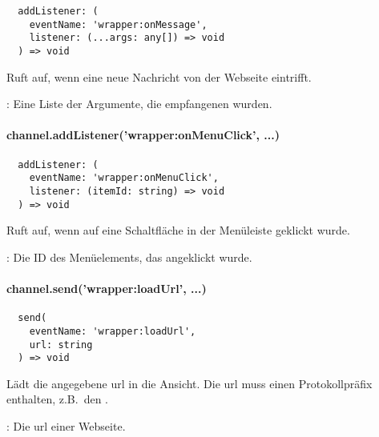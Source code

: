 \begin{verbatim}
  addListener: (
    eventName: 'wrapper:onMessage',
    listener: (...args: any[]) => void
  ) => void
\end{verbatim}

Ruft  auf, wenn eine neue Nachricht von der Webseite eintrifft.

\begin{arguments}
  \item {}: Eine Liste der Argumente, die empfangenen wurden.
\end{arguments}


\newpage

\paragraph{channel.addListener('wrapper:onMenuClick', ...)}

\begin{verbatim}
  addListener: (
    eventName: 'wrapper:onMenuClick',
    listener: (itemId: string) => void
  ) => void
\end{verbatim}

Ruft  auf, wenn auf eine Schaltfläche in der Menüleiste geklickt wurde.

\begin{arguments}
  \item {}: Die ID des Menüelements, das angeklickt wurde.
\end{arguments}




\paragraph{channel.send('wrapper:loadUrl', ...)}

\begin{verbatim}
  send(
    eventName: 'wrapper:loadUrl',
    url: string
  ) => void
\end{verbatim}

Lädt die angegebene \ac{url} in die Ansicht.
Die \ac{url} muss einen Protokollpräfix enthalten, z.B.\ den .

\begin{arguments}
  \item {}: Die \ac{url} einer Webseite.
\end{arguments}

